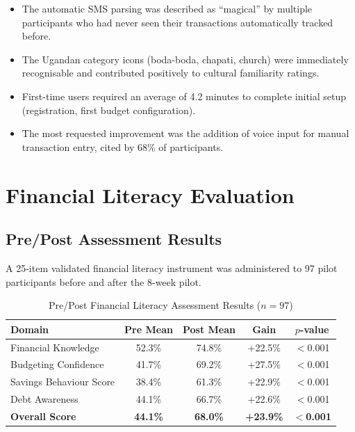 \documentclass[12pt]{report}
\begin{document}
\begin{itemize}
    \item The automatic SMS parsing was described as ``magical'' by multiple participants who had never seen their transactions automatically tracked before.
    \item The Ugandan category icons (boda-boda, chapati, church) were immediately recognisable and contributed positively to cultural familiarity ratings.
    \item First-time users required an average of 4.2 minutes to complete initial setup (registration, first budget configuration).
    \item The most requested improvement was the addition of voice input for manual transaction entry, cited by 68\% of participants.
\end{itemize}

\section{Financial Literacy Evaluation}

\subsection{Pre/Post Assessment Results}

A 25-item validated financial literacy instrument was administered to 97 pilot
participants before and after the 8-week pilot.

\begin{table}[H]
\centering
\caption{Pre/Post Financial Literacy Assessment Results ($n = 97$)}
\label{tab:literacy_results}
\begin{tabular}{lcccc}
\toprule
\textbf{Domain} & \textbf{Pre Mean} & \textbf{Post Mean} & \textbf{Gain} & \textbf{$p$-value} \\
\midrule
Financial Knowledge     & 52.3\% & 74.8\% & +22.5\% & $<$0.001 \\
Budgeting Confidence    & 41.7\% & 69.2\% & +27.5\% & $<$0.001 \\
Savings Behaviour Score & 38.4\% & 61.3\% & +22.9\% & $<$0.001 \\
Debt Awareness          & 44.1\% & 66.7\% & +22.6\% & $<$0.001 \\
\midrule
\textbf{Overall Score}  & \textbf{44.1\%} & \textbf{68.0\%} & \textbf{+23.9\%} & $<$\textbf{0.001} \\
\bottomrule
\end{tabular}
\end{table}
\end{document}
